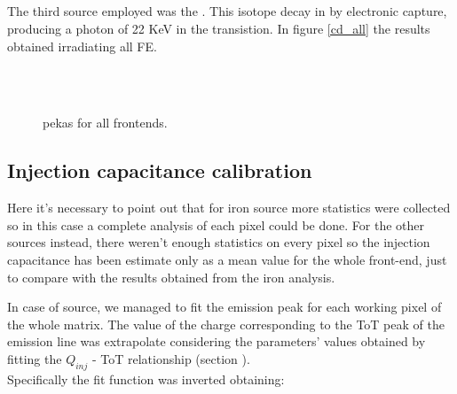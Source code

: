 \subsection{}

The third source employed was the . This isotope decay in  by electronic capture, producing a photon of 22 KeV in the transistion. In figure \vref{cd_all} the results obtained irradiating all FE. 

\begin{figure}[h!]
\centering
{}\quad
{}\\
\quad
{}\\
\caption{ pekas for all frontends.}
\label{fig:cd_all}
\end{figure}



\subsection{Injection capacitance calibration}

Here it's necessary to point out that for iron source more statistics were collected so in this case a complete analysis of each pixel could be done. For the other sources instead, there weren't enough statistics on every pixel so the injection capacitance has been estimate only as a mean value for the whole front-end, just to compare with the results obtained from the iron analysis.  

In case of  source, we managed to fit the emission peak for each working pixel of the whole matrix. The value of the charge corresponding to the ToT peak of the emission line was extrapolate considering the parameters' values obtained by fitting the $Q_{inj}$ - ToT relationship (section ). \\

Specifically the fit function  was inverted obtaining:

